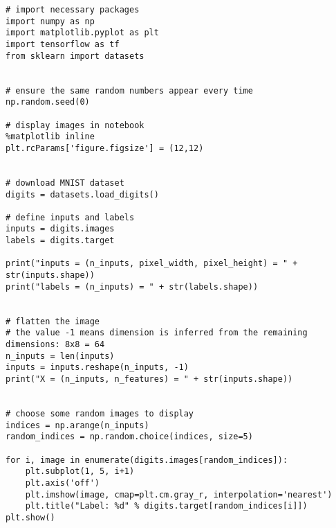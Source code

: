 \begin{verbatim}
# import necessary packages
import numpy as np
import matplotlib.pyplot as plt
import tensorflow as tf
from sklearn import datasets


# ensure the same random numbers appear every time
np.random.seed(0)

# display images in notebook
%matplotlib inline
plt.rcParams['figure.figsize'] = (12,12)


# download MNIST dataset
digits = datasets.load_digits()

# define inputs and labels
inputs = digits.images
labels = digits.target

print("inputs = (n_inputs, pixel_width, pixel_height) = " + str(inputs.shape))
print("labels = (n_inputs) = " + str(labels.shape))


# flatten the image
# the value -1 means dimension is inferred from the remaining dimensions: 8x8 = 64
n_inputs = len(inputs)
inputs = inputs.reshape(n_inputs, -1)
print("X = (n_inputs, n_features) = " + str(inputs.shape))


# choose some random images to display
indices = np.arange(n_inputs)
random_indices = np.random.choice(indices, size=5)

for i, image in enumerate(digits.images[random_indices]):
    plt.subplot(1, 5, i+1)
    plt.axis('off')
    plt.imshow(image, cmap=plt.cm.gray_r, interpolation='nearest')
    plt.title("Label: %d" % digits.target[random_indices[i]])
plt.show()

\end{verbatim}





















